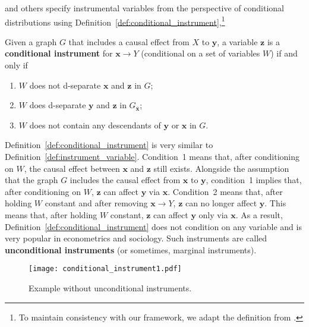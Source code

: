 \documentclass[11pt,review,authoryear]{elsarticle}
\begin{document}
\citet{pearl2009causality} and others \citep{spirtes2000causation,brito2002generalized,silva2017learning} specify instrumental variables from the perspective of conditional distributions using Definition~\ref{def:conditional_instrument},\footnote{To maintain consistency with our framework, we adapt the definition from \citet{silva2017learning}.}

\begin{definition}
  Given a graph $G$ that includes a causal effect from $X$ to $\mathbf{y}$, a variable $\mathbf{z}$ is a \textbf{conditional instrument} for $\mathbf{x} \rightarrow Y$ (conditional on a set of variables $W$) if and only if
  \begin{enumerate}
    \item $W$ does not d-separate $\mathbf{x}$ and $\mathbf{z}$ in $G$;
    \item $W$ does d-separate $\mathbf{y}$ and $\mathbf{z}$ in $G_{\overline{\mathbf{x}}}$;
    \item $W$ does not contain any descendants of $\mathbf{y}$ or $\mathbf{x}$ in $G$.
  \end{enumerate}
  \label{def:conditional_instrument}
\end{definition}

Definition~\ref{def:conditional_instrument} is very similar to Definition~\ref{def:instrument_variable}. Condition~1 means that, after conditioning on $W$, the causal effect between $\mathbf{x}$ and $\mathbf{z}$ still exists. Alongside the assumption that the graph $G$ includes the causal effect from $\mathbf{x}$ to $\mathbf{y}$, condition~1 implies that, after conditioning on $W$, $\mathbf{z}$ can affect $\mathbf{y}$ via $\mathbf{x}$. Condition~2 means that, after holding $W$ constant and after removing $\mathbf{x} \rightarrow Y$, $\mathbf{z}$ can no longer affect $\mathbf{y}$. This means that, after holding $W$ constant, $\mathbf{z}$ can affect $\mathbf{y}$ only via $\mathbf{x}$. As a result, Definition~\ref{def:conditional_instrument} does not condition on any variable and is very popular in econometrics and sociology. Such instruments are called \textbf{unconditional instruments} (or sometimes, marginal instruments).

\begin{figure}[H]
  \centering
  \texttt{[image: conditional\_instrument1.pdf]}
  \caption{\citep{brito2002generalized} Example without unconditional instruments.}
  \label{fig:conditional_instrument1}
\end{figure}
\end{document}
